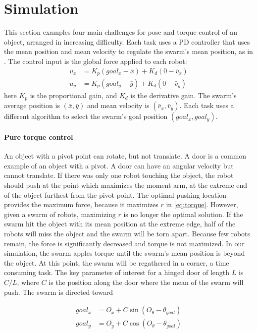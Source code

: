 
\section{Simulation}\label{sec:simulation}
This section examples four main challenges for pose and torque control of an object, arranged in increasing difficulty.  Each task uses a PD controller that uses the mean position and mean velocity to regulate the swarm's mean position,  as in \cite{ShahrokhiIROS2015}. The control input is the global force applied to each robot:
\begin{align}
u_x &= K_{p}(goal_x - \bar{x}) + K_{d}(0-\bar{v}_x) \nonumber\\
u_y &= K_{p}(goal_y  - \bar{y}) + K_{d}(0-\bar{v}_y)  \label{eq:PDcontrolPosition}
\end{align}
here $K_{p}$ is the proportional gain, and $K_{d}$ is the derivative gain.  
The swarm's average position is $(\bar{x},\bar{y})$ and mean velocity is $(\bar{v}_x,\bar{v}_y)$.  
Each task uses a different algorithm to select the swarm's goal position $(goal_x,goal_y)$.

\paragraph{Pure torque control} 
An object with a pivot point can rotate, but not translate. A door is a common example of an object with a pivot. A door can have an angular velocity but cannot translate. 
 If there was only one robot touching the object, the robot should push at the point which maximizes the moment arm, at the extreme end of the object furthest from the pivot point.
The optimal pushing location provides the maximum force, because it maximizes  $r$ in \eqref{eq:torque}.
However, given a swarm of robots, maximizing $r$ is no longer the optimal solution.  
If the swarm hit the object with its mean position at the extreme edge, half of the robots will miss the object and  the swarm will be torn apart.
Because few robots remain,  the force is significantly decreased and torque is not maximized.
 In our simulation, the swarm apples torque until the swarm's mean position is beyond the object.  At this point, the swarm will be regathered in a corner, a time consuming task. 
 The key parameter of interest for a hinged door of length $L$ is $C/L$, where $C$ is the position along the door where the mean of the swarm will push.  The swarm is directed toward 
 
\begin{align}\nonumber
goal_x &= O_x + C \sin(O_{\theta}- \theta_{goal}) \\
goal_y &= O_y + C \cos(O_{\theta}- \theta_{goal})  \label{eq:TorqueControl}
\end{align}

